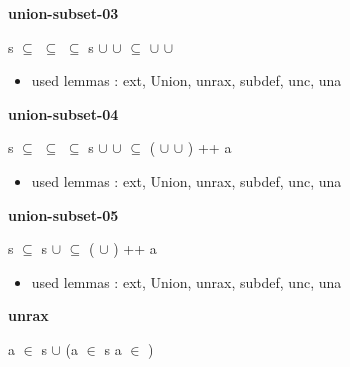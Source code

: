 \documentclass[a4paper]{article}
\begin{document}
\medskip

\bigskip

{\large\bf union-subset-03}

\medskip

 \Fol s $\subseteq$  \And {} $\subseteq$  \And {} $\subseteq$  \Imp s $\cup$  $\cup$  $\subseteq$  $\cup$  $\cup$ 

\begin{itemize}


\item       used lemmas  : ext, Union, unrax, subdef, unc, una

\end{itemize}

\medskip

\bigskip

{\large\bf union-subset-04}

\medskip

 \Fol s $\subseteq$  \And {} $\subseteq$  \And {} $\subseteq$  \Imp s $\cup$  $\cup$  $\subseteq$ ( $\cup$  $\cup$ ) ++ a

\begin{itemize}


\item       used lemmas  : ext, Union, unrax, subdef, unc, una

\end{itemize}

\medskip

\bigskip

{\large\bf union-subset-05}

\medskip

 \Fol s $\subseteq$  \Imp s $\cup$  $\subseteq$ ( $\cup$ ) ++ a

\begin{itemize}


\item       used lemmas  : ext, Union, unrax, subdef, unc, una

\end{itemize}

\medskip

\bigskip

{\large\bf unrax}

\medskip

 \Fol a $\in$ s $\cup$  \Equiv \Not \Not (a $\in$ s \Or a $\in$ )
\end{document}
